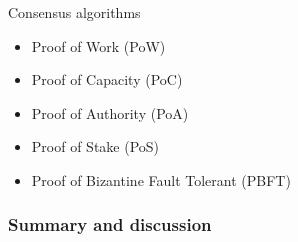 Consensus algorithms
\begin{itemize}
	\item Proof of Work (PoW)
	\item Proof of Capacity (PoC)
	\item Proof of Authority (PoA)
	\item Proof of Stake (PoS)
	\item Proof of Bizantine Fault Tolerant (PBFT)
\end{itemize}


\subsubsection{Summary and discussion}










